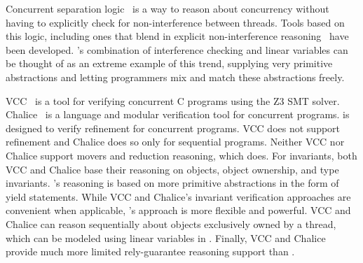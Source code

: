 Concurrent separation logic~\cite{OHearn07} is a way to reason about concurrency without having to explicitly check for non-interference between threads. Tools based on this logic, including ones that blend in explicit non-interference reasoning~\cite{SAGL,RGSep} have been developed. \civl's combination of interference checking and linear variables can be thought of as an extreme example of this trend, supplying very primitive abstractions and letting programmers mix and match these abstractions freely.




VCC~\cite{VCC} is a tool for verifying concurrent C programs using the Z3 SMT solver.  
Chalice~\cite{LM09} is a language and modular verification tool for concurrent programs. 
\civl is designed to verify refinement for concurrent programs.  VCC does not support refinement and Chalice does so only for sequential programs. 
Neither VCC nor Chalice support movers and reduction reasoning, which \civl does. 
For invariants, both VCC and Chalice base their reasoning on objects, object ownership, and type invariants. 
\civl's reasoning is based on more primitive abstractions in the form of yield statements. While VCC and Chalice's invariant verification approaches are convenient when applicable, \civl's approach is more flexible and powerful. VCC and Chalice can reason sequentially about objects exclusively owned by a thread, which can be modeled using linear variables in \civl. Finally, VCC and Chalice provide much more limited rely-guarantee reasoning support than \civl. 

